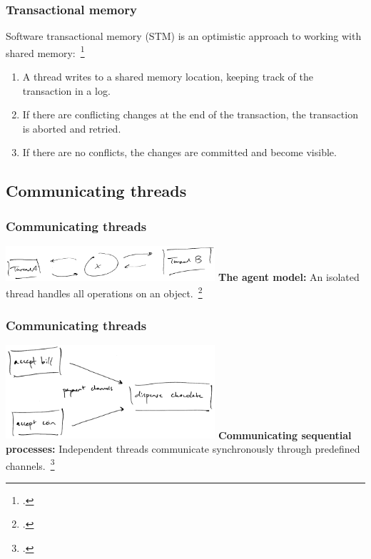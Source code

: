 \documentclass[aspectratio=1610]{beamer}
\begin{document}
  \begin{frame}
    \frametitle{Transactional memory}

    Software transactional memory (STM) is an optimistic approach to working with shared memory:~\footcite{Shavit1995}

    \begin{enumerate}
      \item A thread writes to a shared memory location, keeping track of the transaction in a log.
      \item If there are conflicting changes at the end of the transaction, the transaction is aborted and retried.
      \item If there are no conflicts, the changes are committed and become visible.
    \end{enumerate}
  \end{frame}

  \subsection{Communicating threads}

  \begin{frame}
    \frametitle{Communicating threads}
    \centering

    \includegraphics[width=220pt]{../figures/agent}
    \vfill
    \textbf{The agent model:} An isolated thread handles all operations on an object.~\footcite{Swalens2014}
  \end{frame}

  \begin{frame}
    \frametitle{Communicating threads}
    \centering

    \includegraphics[width=220pt]{../figures/csp}
    \vfill
    \textbf{Communicating sequential processes:} Independent threads communicate synchronously through predefined channels.~\footcite{Hoare1978}
  \end{frame}
\end{document}
